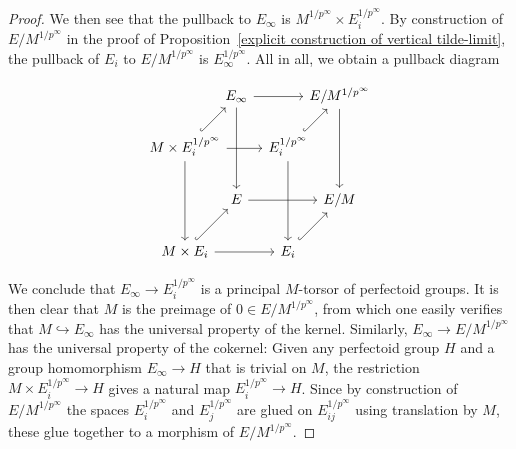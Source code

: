 \documentclass[11pt,oneside]{amsart}
\theoremstyle{definition}
\theoremstyle{remark}
\begin{document}
\begin{proof}
		We then see that the pullback to $E_\infty$ is $M^{1/p^\infty}\times E_i^{1/p^\infty}$. 
		By construction of $E/M^{1/p^\infty}$ in the proof of Proposition~\ref{explicit construction of vertical tilde-limit}, the pullback of $E_i$ to $E/M^{1/p^\infty}$ is $E_\infty^{1/p^\infty}$. All in all, we obtain a pullback diagram
		\begin{center}
		\begin{equation}\label{pullback diagram covering map E inf to E/M^1/p^inf }
		\begin{tikzcd}[column sep={1.3cm,between origins},row sep={1.3cm,between origins}]
			& E_\infty \arrow[dd] \arrow[rr] &  & E/M^{1/p^\infty} \arrow[dd] \\
			M\times E_i^{1/p^\infty} \arrow[dd] \arrow[rr] \arrow[ru, hook] &  & E_i^{1/p^\infty} \arrow[dd] \arrow[ru, hook] &  \\
			& E \arrow[rr] &  & E/M \\
			M\times E_i \arrow[rr] \arrow[ru, hook] &  & E_i \arrow[ru, hook] & 
		\end{tikzcd}
		\end{equation}
		\end{center}
		We conclude that $E_\infty \rightarrow E_i^{1/p^\infty}$ is a principal $M$-torsor of perfectoid groups. It is then clear that $M$ is the preimage of $0\in E/M^{1/p^\infty}$, from which one easily verifies that $M\hookrightarrow E_\infty$ has the universal property of the kernel.
		Similarly, $E_\infty \rightarrow E/M^{1/p^\infty}$ has the universal property of the cokernel: Given any perfectoid group $H$ and a group homomorphism $E_\infty\rightarrow H$ that is trivial on $M$, the restriction $M\times E_i^{1/p^\infty}\rightarrow H$ gives a natural map $E_i^{1/p^\infty}\rightarrow H$. Since by construction of $E/M^{1/p^\infty}$ the spaces $E_i^{1/p^\infty}$ and $E_j^{1/p^\infty}$ are glued on $E_{ij}^{1/p^\infty}$ using translation by $M$, these glue together to a morphism of $E/M^{1/p^\infty}$.
	\end{proof}
	
\end{document}
